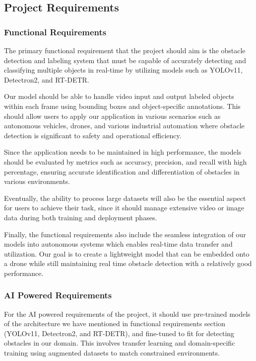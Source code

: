 \documentclass[stu,12pt,floatsintext]{apa7}
\begin{document}
\subsection{Project Requirements}
\subsubsection{Functional Requirements}

The primary functional requirement that the project should aim is the obstacle detection and labeling system that must be capable of accurately detecting and classifying multiple objects in real-time by utilizing models such as YOLOv11, Detectron2, and RT-DETR.

Our model should be able to handle video input and output labeled objects within each frame using bounding boxes and object-specific annotations. This should allow users to apply our application in various scenarios such as autonomous vehicles, drones, and various industrial automation where obstacle detection is significant to safety and operational efficiency.

Since the application needs to be maintained in high performance, the models should be evaluated by metrics such as accuracy, precision, and recall with high percentage, ensuring accurate identification and differentiation of obstacles in various environments.

Eventually, the ability to process large datasets will also be the essential aspect for users to achieve their task, since it should manage extensive video or image data during both training and deployment phases.

Finally, the functional requirements also include the seamless integration of our models into autonomous systems which enables real-time data transfer and utilization. Our goal is to create a lightweight model that can be embedded onto a drone while still maintaining real time obstacle detection with a relatively good performance.

\subsubsection{AI Powered Requirements}

For the AI powered requirements of the project, it should use pre-trained models of the architecture we have mentioned in functional requirements section (YOLOv11, Detectron2, and RT-DETR), and fine-tuned to fit for detecting obstacles in our domain. This involves transfer learning and domain-specific training using augmented datasets to match constrained environments.
\end{document}
